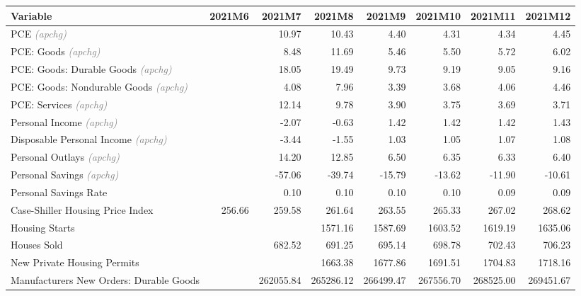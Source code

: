\documentclass[11pt, letterpaper]{article}\usepackage[]{graphicx}\usepackage[]{color}
\begin{document}
\begin{table}[H]
\centering
\begingroup\fontsize{10pt}{12pt}\selectfont
\begin{tabular}{lrrrrrrr}
  \hline
Variable & 2021M6 & 2021M7 & 2021M8 & 2021M9 & 2021M10 & 2021M11 & 2021M12 \\ 
  \hline
PCE \textit{\footnotesize\textcolor{gray}{(apchg)}} &  & 10.97 & 10.43 & 4.40 & 4.31 & 4.34 & 4.45 \\ 
  PCE: Goods \textit{\footnotesize\textcolor{gray}{(apchg)}} &  & 8.48 & 11.69 & 5.46 & 5.50 & 5.72 & 6.02 \\ 
  PCE: Goods: Durable Goods \textit{\footnotesize\textcolor{gray}{(apchg)}} &  & 18.05 & 19.49 & 9.73 & 9.19 & 9.05 & 9.16 \\ 
  PCE: Goods: Nondurable Goods \textit{\footnotesize\textcolor{gray}{(apchg)}} &  & 4.08 & 7.96 & 3.39 & 3.68 & 4.06 & 4.46 \\ 
  PCE: Services \textit{\footnotesize\textcolor{gray}{(apchg)}} &  & 12.14 & 9.78 & 3.90 & 3.75 & 3.69 & 3.71 \\ 
  Personal Income \textit{\footnotesize\textcolor{gray}{(apchg)}} &  & -2.07 & -0.63 & 1.42 & 1.42 & 1.42 & 1.43 \\ 
  Disposable Personal Income \textit{\footnotesize\textcolor{gray}{(apchg)}} &  & -3.44 & -1.55 & 1.03 & 1.05 & 1.07 & 1.08 \\ 
  Personal Outlays \textit{\footnotesize\textcolor{gray}{(apchg)}} &  & 14.20 & 12.85 & 6.50 & 6.35 & 6.33 & 6.40 \\ 
  Personal Savings \textit{\footnotesize\textcolor{gray}{(apchg)}} &  & -57.06 & -39.74 & -15.79 & -13.62 & -11.90 & -10.61 \\ 
  Personal Savings Rate &  & 0.10 & 0.10 & 0.10 & 0.10 & 0.09 & 0.09 \\ 
  Case-Shiller Housing Price Index & 256.66 & 259.58 & 261.64 & 263.55 & 265.33 & 267.02 & 268.62 \\ 
  Housing Starts &  &  & 1571.16 & 1587.69 & 1603.52 & 1619.19 & 1635.06 \\ 
  Houses Sold &  & 682.52 & 691.25 & 695.14 & 698.78 & 702.43 & 706.23 \\ 
  New Private Housing Permits &  &  & 1663.38 & 1677.86 & 1691.51 & 1704.83 & 1718.16 \\ 
  Manufacturers New Orders: Durable Goods &  & 262055.84 & 265286.12 & 266499.47 & 267556.70 & 268525.00 & 269451.67 \\ 

\end{tabular}
\end{table}
\end{document}

